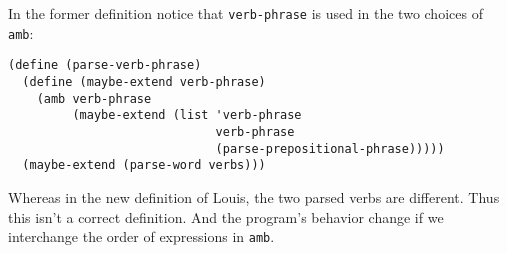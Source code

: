 \documentclass[a4paper,12pt]{article}
\begin{document}
In the former definition notice that \lstinline!verb-phrase! is used in
the two choices of \lstinline!amb!:

\begin{lstlisting}
(define (parse-verb-phrase)
  (define (maybe-extend verb-phrase)
    (amb verb-phrase
         (maybe-extend (list 'verb-phrase
                             verb-phrase
                             (parse-prepositional-phrase)))))
  (maybe-extend (parse-word verbs)))
\end{lstlisting}

Whereas in the new definition of Louis, the two parsed verbs are
different.  Thus this isn't a correct definition.  And the program's
behavior change if we interchange the order of expressions in
\lstinline!amb!.
\end{document}
